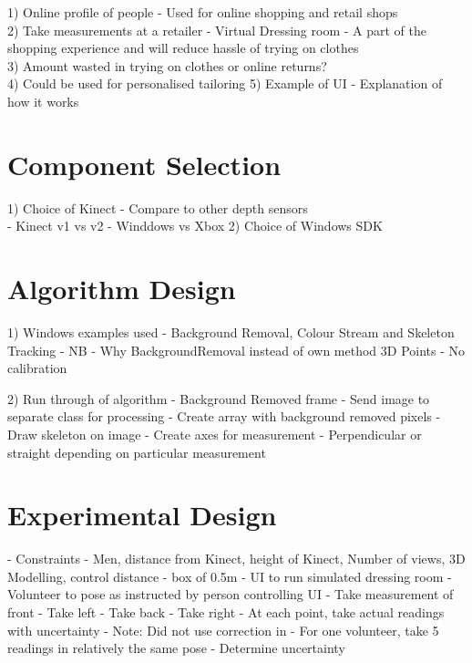 1) Online profile of people - Used for online shopping and retail shops\\
2) Take measurements at a retailer - Virtual Dressing room - A part of the shopping experience and will reduce hassle of trying on clothes\\
3) Amount wasted in trying on clothes or online returns?\\
4) Could be used for personalised tailoring
5) Example of UI - Explanation of how it works

\section{Component Selection}
1) Choice of Kinect - Compare to other depth sensors\\
- Kinect v1 vs v2
- Winddows vs Xbox
2) Choice of Windows SDK\\

\section{Algorithm Design}
1) Windows examples used - Background Removal, Colour Stream and Skeleton Tracking - NB - Why BackgroundRemoval instead of own method
3D Points - No calibration

2) Run through of algorithm
- Background Removed frame
- Send image to separate class for processing
- Create array with background removed pixels
- Draw skeleton on image
- Create axes for measurement - Perpendicular or straight depending on particular measurement

\section{Experimental Design}
- Constraints - Men, distance from Kinect, height of Kinect, Number of views, 3D Modelling, control distance - box of 0.5m
- UI to run simulated dressing room
- Volunteer to pose as instructed by person controlling UI
- Take measurement of front
- Take left
- Take back
- Take right 
- At each point, take actual readings with uncertainty
- Note: Did not use correction in \cite{nonContact2017}
- For one volunteer, take 5 readings in relatively the same pose - Determine uncertainty 